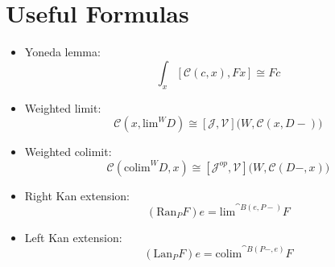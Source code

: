 \documentclass[DaoFP]{subfiles}
\begin{document}
\section{Useful Formulas}
\begin{itemize}
\item Yoneda lemma:
\[ \int_x [\mathcal C( c, x), F x] \cong F c \]
\item Weighted limit:
\[  \mathcal C(x, \text{lim}^W D) \cong [\mathcal J, \mathcal V] \big(W, \mathcal C(x, D-)\big) \]
\item Weighted colimit:
\[  \mathcal C(\text{colim}^W D, x) \cong [\mathcal J^{op}, \mathcal V] \big(W, \mathcal C(D-, x)\big) \]
\item Right Kan extension:
\[ (\text{Ran}_P F) e = \text{lim}^{\cat B(e, P-)} F  \]
\item Left Kan extension:
\[ (\text{Lan}_P F) e = \text{colim}^{\cat B(P-, e)} F \]
\end{itemize}
\end{document}

